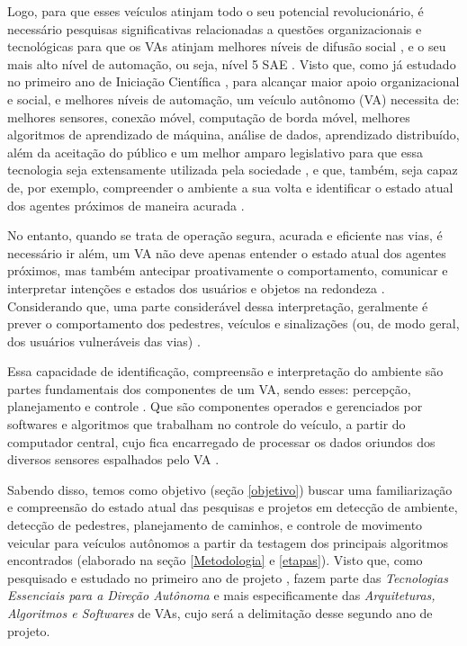 \documentclass{article}
\begin{document}
Logo, para que esses veículos atinjam todo o seu potencial revolucionário, é necessário pesquisas significativas relacionadas a questões organizacionais e tecnológicas para que os VAs atinjam melhores níveis de difusão social \cite{noauthor_undated-mw}, e o seu mais alto nível de automação, ou seja, nível 5 SAE \cite{SAE}. Visto que, como já estudado no primeiro ano de Iniciação Científica \cite{my-work-on-git}, para alcançar maior apoio organizacional e social, e melhores níveis de automação, um veículo autônomo (VA) necessita de: melhores sensores, conexão móvel, computação de borda móvel, melhores algoritmos de aprendizado de máquina, análise de dados, aprendizado distribuído, além da aceitação do público e um melhor amparo legislativo para que essa tecnologia seja extensamente utilizada pela sociedade \cite{KPMG}, e que, também, seja capaz de, por exemplo, compreender o ambiente a sua volta e identificar o estado atual dos agentes próximos de maneira acurada \cite{sensors-yet}.


No entanto, quando se trata de operação segura, acurada e eficiente nas vias, é necessário ir além, um VA não deve apenas entender o estado atual dos agentes próximos, mas também antecipar proativamente o comportamento, comunicar e interpretar intenções e estados dos usuários e objetos na redondeza \cite{conge}. Considerando que, uma parte considerável dessa interpretação, geralmente é prever o comportamento dos pedestres, veículos e sinalizações (ou, de modo geral, dos usuários vulneráveis das vias) \cite{software-review}.


Essa capacidade de identificação, compreensão e interpretação do ambiente são partes fundamentais dos componentes de um VA, sendo esses: percepção, planejamento e controle \cite[p. ~37]{my-work-on-git}. Que são componentes operados e gerenciados por softwares e algoritmos que trabalham no controle do veículo, a partir do computador central, cujo fica encarregado de processar os dados oriundos dos diversos sensores espalhados pelo VA \cite[p. ~39]{my-work-on-git}.


Sabendo disso, temos como objetivo (seção \ref{objetivo}) buscar uma familiarização e compreensão do estado atual das pesquisas e projetos em detecção de ambiente, detecção de pedestres, planejamento de caminhos, e controle de movimento veicular para veículos autônomos a partir da testagem dos principais algoritmos encontrados (elaborado na seção \ref{Metodologia} e \ref{etapas}). Visto que, como pesquisado e estudado no primeiro ano de projeto \cite{my-work-on-git}, fazem parte das \textit{Tecnologias Essenciais para a Direção Autônoma} e mais especificamente das \textit{Arquiteturas, Algoritmos e Softwares} de VAs, cujo será a delimitação desse segundo ano de projeto.
\end{document}
